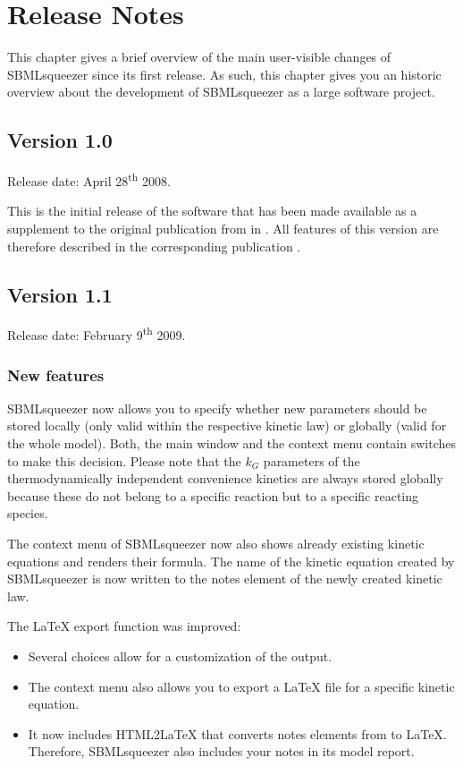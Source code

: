 \chapter{Release Notes}

This chapter gives a brief overview of the main user-visible changes of
SBMLsqueezer since its first release. As such, this chapter gives you an
historic overview about the development of SBMLsqueezer as a large software
project.  

\section{Version 1.0}

Release date: April 28\textsuperscript{th} 2008.

This is the initial release of the software that has been made available as
a supplement to the original publication from in \citeyear{Draeger2008}. All
features of this version are therefore described in the corresponding
publication \cite{Draeger2008}.

\section{Version 1.1}

Release date: February 9\textsuperscript{th} 2009.

\subsection{New features}

SBMLsqueezer now allows you to specify whether new parameters should be stored
locally (only valid within the respective kinetic law) or globally (valid for
the whole model). Both, the main window and the context menu contain switches to
make this decision. Please note that the $k_G$ parameters of the
thermodynamically independent convenience kinetics are always stored globally
because these do not belong to a specific reaction but to a specific reacting
species.

The context menu of SBMLsqueezer now also shows already existing kinetic
equations and renders their formula. The name of the kinetic equation created by
SBMLsqueezer is now written to the notes element of the newly created kinetic
law.

The \LaTeX{} export function was improved:
\begin{itemize}
  \item Several choices allow for a customization of the output.
  \item The context menu also allows you to export a LaTeX file for a specific
        kinetic equation.
  \item It now includes HTML2\LaTeX{} that converts notes elements from \XHTML to
        \LaTeX. Therefore, SBMLsqueezer also includes your notes in its model
        report.
\end{itemize}

